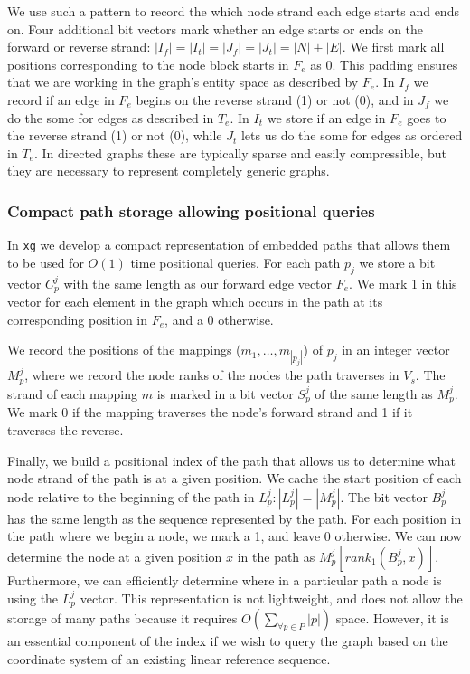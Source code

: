 \documentclass{article}
\begin{document}
We use such a pattern to record the which node strand each edge starts and ends on.
Four additional bit vectors mark whether an edge starts or ends on the forward or reverse strand: $|I_f| = |I_t| = |J_f| = |J_t| = |N| + |E|$.
We first mark all positions corresponding to the node block starts in $F_e$ as 0.
This padding ensures that we are working in the graph's entity space as described by $F_e$.
In $I_f$ we record if an edge in $F_e$ begins on the reverse strand (1) or not (0), and in $J_f$ we do the some for edges as described in $T_e$.
In $I_t$ we store if an edge in $F_e$ goes to the reverse strand (1) or not (0), while $J_t$ lets us do the some for edges as ordered in $T_e$.
In directed graphs these are typically sparse and easily compressible, but they are necessary to represent completely generic graphs.

\subsubsection{Compact path storage allowing positional queries}

In {\tt xg} we develop a compact representation of embedded paths that allows them to be used for $O(1)$ time positional queries.
For each path $p_j$ we store a bit vector $C_p^j$ with the same length as our forward edge vector $F_e$.
We mark 1 in this vector for each element in the graph which occurs in the path at its corresponding position in $F_e$, and a 0 otherwise.

We record the positions of the mappings ($m_1, \ldots, m_{|p_j|}$) of $p_j$ in an integer vector $M_p^j$, where we record the node ranks of the nodes the path traverses in $V_s$.
The strand of each mapping $m$ is marked in a bit vector $S_p^j$ of the same length as $M_p^j$.
We mark 0 if the mapping traverses the node's forward strand and 1 if it traverses the reverse.

Finally, we build a positional index of the path that allows us to determine what node strand of the path is at a given position.
We cache the start position of each node relative to the beginning of the path in $L_p^j : |L_p^j| = |M_p^j|$.
The bit vector $B_p^j$ has the same length as the sequence represented by the path.
For each position in the path where we begin a node, we mark a 1, and leave 0 otherwise.
We can now determine the node at a given position $x$ in the path as $M_p^j[rank_1(B_p^j, x)]$.
Furthermore, we can efficiently determine where in a particular path a node is using the $L_p^j$ vector.
This representation is not lightweight, and does not allow the storage of many paths because it requires $O(\sum_{\forall p \in P}{|p|})$ space.
However, it is an essential component of the index if we wish to query the graph based on the coordinate system of an existing linear reference sequence.
\end{document}
